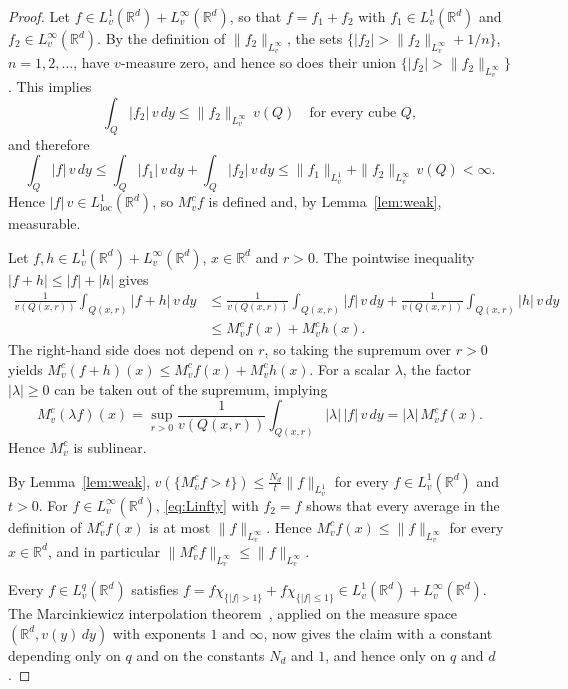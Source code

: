 \documentclass[12pt]{article}
\begin{document}
\begin{proof}
Let $f \in L^1_v(\mathbb{R}^d) + L^\infty_v(\mathbb{R}^d)$, so that $f = f_1 + f_2$ with $f_1 \in L^1_v(\mathbb{R}^d)$ and $f_2 \in L^\infty_v(\mathbb{R}^d)$. By the definition of $\|f_2\|_{L^\infty_v}$, the sets $\{|f_2| > \|f_2\|_{L^\infty_v} + 1/n\}$, $n = 1, 2, \ldots$, have $v$-measure zero, and hence so does their union $\{|f_2| > \|f_2\|_{L^\infty_v}\}$. This implies
\begin{equation}\label{eq:Linfty}
  \int_Q |f_2|\,v\,dy \le \|f_2\|_{L^\infty_v}\, v(Q) \quad \text{for every cube } Q,
\end{equation}
and therefore
\[
  \int_Q |f|\,v\,dy \le \int_Q |f_1|\,v\,dy + \int_Q |f_2|\,v\,dy \le \|f_1\|_{L^1_v} + \|f_2\|_{L^\infty_v}\, v(Q) < \infty .
\]
Hence $|f|\,v \in L^1_{\mathrm{loc}}(\mathbb{R}^d)$, so $M^c_v f$ is defined and, by Lemma~\ref{lem:weak}, measurable.

Let $f, h \in L^1_v(\mathbb{R}^d) + L^\infty_v(\mathbb{R}^d)$, $x \in \mathbb{R}^d$ and $r > 0$. The pointwise inequality $|f + h| \le |f| + |h|$ gives
\begin{align*}
  \frac{1}{v(Q(x,r))}\int_{Q(x,r)} |f + h|\,v\,dy &\le \frac{1}{v(Q(x,r))}\int_{Q(x,r)} |f|\,v\,dy + \frac{1}{v(Q(x,r))}\int_{Q(x,r)} |h|\,v\,dy \\
  &\le M^c_v f(x) + M^c_v h(x).
\end{align*}
The right-hand side does not depend on $r$, so taking the supremum over $r > 0$ yields $M^c_v(f + h)(x) \le M^c_v f(x) + M^c_v h(x)$. For a scalar $\lambda$, the factor $|\lambda| \ge 0$ can be taken out of the supremum, implying
\[
  M^c_v(\lambda f)(x) = \sup_{r > 0} \frac{1}{v(Q(x,r))}\int_{Q(x,r)} |\lambda|\,|f|\,v\,dy = |\lambda|\, M^c_v f(x).
\]
Hence $M^c_v$ is sublinear.

By Lemma~\ref{lem:weak}, $v(\{M^c_v f > t\}) \le \frac{N_d}{t} \|f\|_{L^1_v}$ for every $f \in L^1_v(\mathbb{R}^d)$ and $t > 0$. For $f \in L^\infty_v(\mathbb{R}^d)$, \eqref{eq:Linfty} with $f_2 = f$ shows that every average in the definition of $M^c_v f(x)$ is at most $\|f\|_{L^\infty_v}$. Hence $M^c_v f(x) \le \|f\|_{L^\infty_v}$ for every $x \in \mathbb{R}^d$, and in particular $\|M^c_v f\|_{L^\infty_v} \le \|f\|_{L^\infty_v}$.

Every $f \in L^q_v(\mathbb{R}^d)$ satisfies $f = f\chi_{\{|f| > 1\}} + f\chi_{\{|f| \le 1\}} \in L^1_v(\mathbb{R}^d) + L^\infty_v(\mathbb{R}^d)$. The Marcinkiewicz interpolation theorem~\cite[Theorem A.6]{Duoandikoetxea2013}, applied on the measure space $(\mathbb{R}^d, v(y)\,dy)$ with exponents $1$ and $\infty$, now gives the claim with a constant depending only on $q$ and on the constants $N_d$ and $1$, and hence only on $q$ and $d$.
\end{proof}



\end{document}
